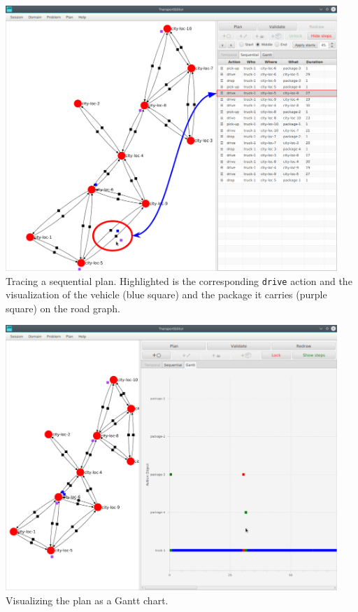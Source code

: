 \begin{center}
\includegraphics[width=0.94\textwidth]{../img/transporteditor_planstates}
Tracing a sequential plan. Highlighted is the corresponding \verb+drive+ action and the visualization of the vehicle (blue square) and the package it carries (purple square) on the road graph.
\end{center}
\medskip

\begin{center}
\includegraphics[width=0.94\textwidth]{../img/transporteditor_gantt}
Visualizing the plan as a Gantt chart.
\end{center}

